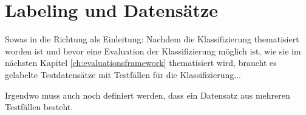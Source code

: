 \chapter{Labeling und Datensätze}\label{ch:labeling-und-datensatze}

Sowas in die Richtung als Einleitung: Nachdem die Klassifizierung thematisiert worden ist und bevor eine Evaluation der Klassifizierung möglich ist, wie sie im nächsten Kapitel \ref{ch:evaluationsframework}
 thematisiert wird, braucht es gelabelte Testdatensätze mit Testfällen für die Klassifizierung...

Irgendwo muss auch noch definiert werden, dass ein Datensatz aus mehreren Testfällen besteht.



